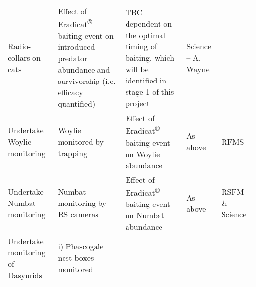\documentclass[version=last,
    paper=a4,                               %
    10pt,                                   %
    dvipsnames,
    oneside,                              %
    headings=openany,                       %
    open=any,
    BCOR=7mm,                               %
    DIV=15,     %
]{scrbook}
\begin{document}
\begin{longtable}[c]{@{}lllll@{}}
\begin{minipage}[t]{0.17\columnwidth}
Radio-collars on cats
\end{minipage} & \begin{minipage}[t]{0.17\columnwidth}\raggedright
Effect of Eradicat\textsuperscript{®} baiting event on introduced
predator abundance and survivorship (i.e. efficacy quantified)
\end{minipage} & \begin{minipage}[t]{0.17\columnwidth}\raggedright
TBC dependent on the optimal timing of baiting, which will be identified
in stage 1 of this project
\end{minipage} & \begin{minipage}[t]{0.17\columnwidth}\raggedright
Science -- A. Wayne
\end{minipage}
\\\addlinespace
\begin{minipage}[t]{0.17\columnwidth}\raggedright
Undertake Woylie monitoring
\end{minipage} & \begin{minipage}[t]{0.17\columnwidth}\raggedright
Woylie monitored by trapping
\end{minipage} & \begin{minipage}[t]{0.17\columnwidth}\raggedright
Effect of Eradicat\textsuperscript{®} baiting event on Woylie abundance
\end{minipage} & \begin{minipage}[t]{0.17\columnwidth}\raggedright
As above
\end{minipage} & \begin{minipage}[t]{0.17\columnwidth}\raggedright
RFMS
\end{minipage}
\\\addlinespace
\begin{minipage}[t]{0.17\columnwidth}\raggedright
Undertake Numbat monitoring
\end{minipage} & \begin{minipage}[t]{0.17\columnwidth}\raggedright
Numbat monitoring by RS cameras
\end{minipage} & \begin{minipage}[t]{0.17\columnwidth}\raggedright
Effect of Eradicat\textsuperscript{®} baiting event on Numbat abundance
\end{minipage} & \begin{minipage}[t]{0.17\columnwidth}\raggedright
As above
\end{minipage} & \begin{minipage}[t]{0.17\columnwidth}\raggedright
RSFM \& Science
\end{minipage}
\\\addlinespace
\begin{minipage}[t]{0.17\columnwidth}\raggedright
Undertake monitoring of Dasyurids
\end{minipage} & \begin{minipage}[t]{0.17\columnwidth}\raggedright
i) Phascogale nest boxes monitored


\end{minipage}
\end{longtable}
\end{document}
